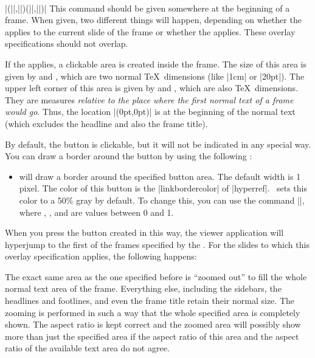 \begin{command}{\framezoom{}\\|(||,||)(||,||)|}
  This command should be given somewhere at the beginning of a frame. When given, two different things will happen, depending on whether the  applies to the current slide of the frame or whether the  applies. These overlay specifications should not overlap.

  If the  applies, a clickable area is created inside the frame. The size of this area is given by  and , which are two normal \TeX\ dimensions (like |1cm| or |20pt|). The upper left corner of this area is given by  and , which are also \TeX\ dimensions. They are measures \emph{relative to the place where the first normal text of a frame would go}. Thus, the location |(0pt,0pt)| is at the beginning of the normal text (which excludes the headline and also the frame title).

  By default, the button is clickable, but it will not be indicated in any special way. You can draw a border around the button by using the following :
  \begin{itemize}
  \item
     will draw a border around the specified button area. The default width is 1 pixel. The color of this  button is the |linkbordercolor| of |hyperref|. \beamer\ sets this color to a 50\% gray by default.\newline    
    To change this, you can use the command ||, where , , and  are values between 0 and 1.
  \end{itemize}

  When you press the button created in this way, the viewer application will hyperjump to the first of the frames specified by the . For the slides to which this overlay specification applies, the following happens:

  The exact same area as the one specified before is ``zoomed out'' to fill the whole normal text area of the frame. Everything else, including the sidebars, the headlines and footlines, and even the frame title retain their normal size. The zooming is performed in such a way that the whole specified area is completely shown. The aspect ratio is kept correct and the zoomed area will possibly show more than just the specified area if the aspect ratio of this area and the aspect ratio of the available text area do not agree.


\end{command}
